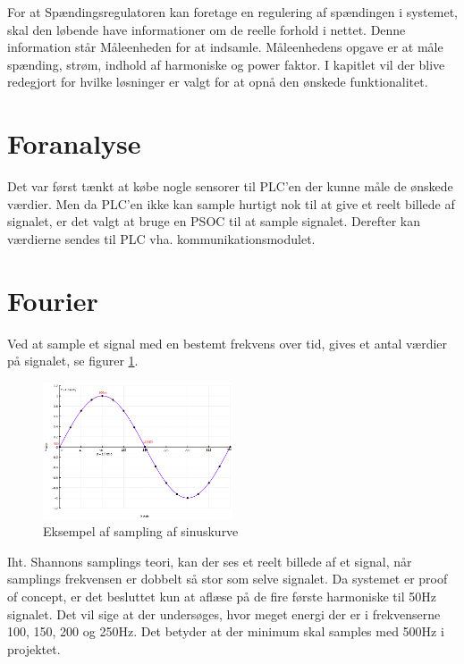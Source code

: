 
For at Spændingsregulatoren kan foretage en regulering af spændingen i systemet, skal den løbende have informationer om de reelle forhold i nettet. Denne information står Måleenheden for at indsamle. Måleenhedens opgave er at måle spænding, strøm, indhold af harmoniske og power faktor. I kapitlet vil der blive redegjort for hvilke løsninger er valgt for at opnå den ønskede funktionalitet. 

\section{Foranalyse}
Det var først tænkt at købe nogle sensorer til PLC'en der kunne måle de ønskede værdier. Men da PLC'en ikke kan sample hurtigt nok til at give et reelt billede af signalet, er det valgt at bruge en PSOC til at sample signalet. Derefter kan værdierne sendes til PLC vha. kommunikationsmodulet.

\section{Fourier}
Ved at sample et signal med en bestemt frekvens over tid, gives et antal værdier på signalet, se figurer \ref{fig:sample}.

\begin{figure}[htbp] %
	\centering
	\includegraphics[width=0.5\textwidth]{figure/sampling}
	\caption{Eksempel af sampling af sinuskurve}
	\label{fig:sample}
\end{figure}  

Iht. Shannons samplings teori\cite{Shannon}, kan der ses et reelt billede af et signal, når samplings frekvensen er dobbelt så stor som selve signalet. Da systemet er proof of concept, er det besluttet kun at aflæse på de fire første harmoniske til 50Hz signalet. Det vil sige at der undersøges, hvor meget energi der er i frekvenserne 100, 150, 200 og 250Hz. Det betyder at der minimum skal samples med 500Hz i projektet.

